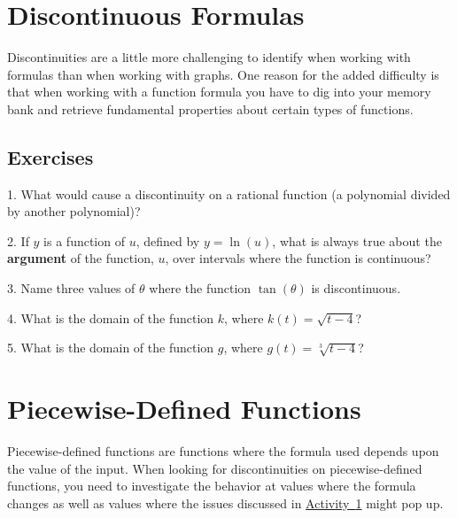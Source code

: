 \documentclass[12pt,]{book}
\newcommand{\terminology}[1]{\textbf{#1}}
\theoremstyle{plain}
\theoremstyle{definition}
\theoremstyle{definition}
\theoremstyle{definition}
\theoremstyle{definition}
\theoremstyle{definition}
\numberwithin{equation}{section}
\newcommand{\fe}[2]{#1\mathopen{}\left(#2\right)\mathclose{}}
\begin{document}
\section[{Discontinuous Formulas}]{Discontinuous Formulas}\label{section-discontinuous-formulas}
Discontinuities are a little more challenging to identify when working with formulas than when working with graphs. One reason for the added difficulty is that when working with a function formula you have to dig into your memory bank and retrieve fundamental properties about certain types of functions.%
\typeout{************************************************}
\typeout{************************************************}
\subsection[{Exercises}]{Exercises}\label{exercises-16}
\begin{exerciselist}
\item[1.]\hypertarget{exercise-124}{}What would cause a discontinuity on a rational function (a polynomial divided by another polynomial)?%
\par\smallskip
\item[2.]\hypertarget{exercise-125}{}If \(y\) is a function of \(u\), defined by \(y=\fe{\ln}{u}\), what is always true about the \terminology{argument} of the function, \(u\), over intervals where the function is continuous?%
\par\smallskip
\item[3.]\hypertarget{exercise-126}{}Name three values of \(\theta\) where the function \(\fe{\tan}{\theta}\) is discontinuous.%
\par\smallskip
\item[4.]\hypertarget{exercise-127}{}What is the domain of the function \(k\), where \(\fe{k}{t}=\sqrt{t-4}\)?%
\par\smallskip
\item[5.]\hypertarget{exercise-128}{}What is the domain of the function \(g\), where \(\fe{g}{t}=\sqrt[3]{t-4}\)?%
\par\smallskip
\end{exerciselist}
\typeout{************************************************}
\typeout{************************************************}
\section[{Piecewise-Defined Functions}]{Piecewise-Defined Functions}\label{section-piecewise-defined-functions}
Piecewise-defined functions are functions where the formula used depends upon the value of the input. When looking for discontinuities on piecewise-defined functions, you need to investigate the behavior at values where the formula changes as well as values where the issues discussed in \hyperref[section-discontinuous-formulas]{Activity~\ref{section-discontinuous-formulas}} might pop up.%
\typeout{************************************************}
\typeout{************************************************}
\end{document}
